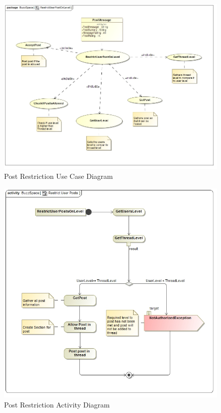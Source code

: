 \documentclass[11pt]{article}
\begin{document}
\begin{enumerate}
\begin{itemize}
			\begin{figure}[H]	
			 	\includegraphics[scale=0.5]{B1UseCase.png}
				\caption{Post Restriction Use Case Diagram}
			\end{figure}

			\begin{figure}[H]	
				\includegraphics[scale=0.5]{B1Activity.png}
				\caption{Post Restriction Activity Diagram}
			\end{figure}
		 

\end{itemize}
\end{enumerate}
\end{document}
